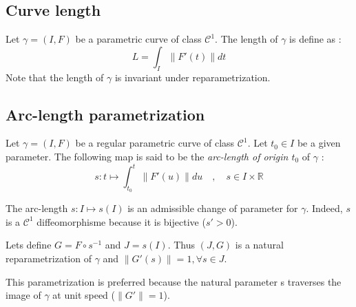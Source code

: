 \subsection{Curve length}
Let $\gamma=(I,F)$ be a parametric curve of class ${\mathcal{C}}^{1}$. The length of $\gamma$ is define as :
\begin{equation}
L=\int_{I}\|F'(t)\|dt
\end{equation}
Note that the length of $\gamma$ is invariant under reparametrization.

\subsection{Arc-length parametrization}
Let $\gamma=(I,F)$ be a regular parametric curve of class ${\mathcal{C}}^{1}$. Let $t_0 \in I$ be a given parameter. The following map is said to be the \emph{arc-length of origin $t_0$} of $\gamma$ :
\begin{equation}
s \colon t \mapsto \int_{t_{0}}^{t}\|F'(u)\|du
\quad,\quad
s \in I \times \mathbb{R}
\end{equation}

The arc-length $s \colon I\mapsto s(I)$ is an admissible change of parameter for $\gamma$. Indeed, $s$ is a ${\mathcal{C}}^{1}$ diffeomorphisme because it is bijective ($s'>0$).

Lets define $G=F\circ s^{-1}$ and $J=s(I)$. Thus $(J,G)$ is a natural reparametrization of $\gamma$ and  $\|G'(s)\| = 1, \forall s \in J$.

This parametrization is preferred because the natural parameter s traverses the image of $\gamma$ at unit speed ($\|G'\| = 1$).




